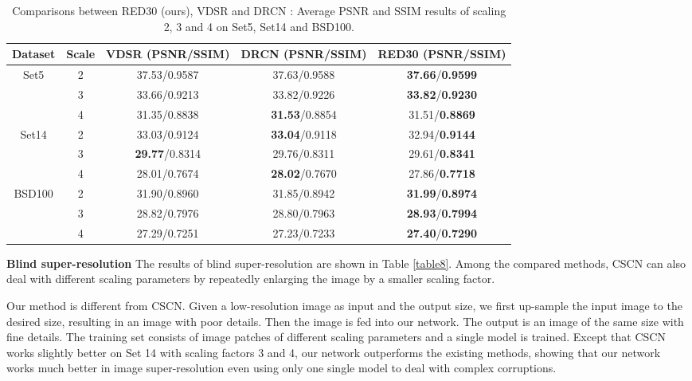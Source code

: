 \documentclass[10pt,journal,compsoc]{IEEEtran}
\begin{document}
\begin{table*}[htb!]
\centering
\caption{Comparisons between RED30 (ours), VDSR \cite{DBLP:journals/corr/KimLL15b}
and DRCN \cite{DBLP:journals/corr/KimLL15a}: Average PSNR and SSIM results of scaling 2, 3 and 4 on Set5, Set14 and BSD100.}
\begin{tabular}{ c|c|c c c }  \hline
Dataset                 &Scale        &VDSR  (PSNR/SSIM)    &DRCN (PSNR/SSIM)    &RED30 (PSNR/SSIM)  \\ \hline
\multirow{3}{*}{Set5}   &2    &37.53/0.9587       &37.63/0.9588       &\textbf{37.66}/\textbf{0.9599}      \\
                        &3    &33.66/0.9213       &33.82/0.9226       &\textbf{33.82}/\textbf{0.9230}      \\
                        &4    &31.35/0.8838       &\textbf{31.53}/0.8854       &31.51/\textbf{0.8869}      \\ \hline\hline
\multirow{3}{*}{Set14}  &2    &33.03/0.9124       &\textbf{33.04}/0.9118       &32.94/\textbf{0.9144}      \\
                        &3    &\textbf{29.77}/0.8314       &29.76/0.8311       &29.61/\textbf{0.8341}      \\
                        &4    &28.01/0.7674       &\textbf{28.02}/0.7670       &27.86/\textbf{0.7718}      \\ \hline\hline
\multirow{3}{*}{BSD100} &2    &31.90/0.8960       &31.85/0.8942       &\textbf{31.99}/\textbf{0.8974}      \\
                        &3    &28.82/0.7976       &28.80/0.7963       &\textbf{28.93}/\textbf{0.7994}      \\
                        &4    &27.29/0.7251       &27.23/0.7233       &\textbf{27.40}/\textbf{0.7290}      \\ \hline
\end{tabular}
\label{table11}
\end{table*}




{\bf{Blind super-resolution}} The results of blind super-resolution are shown in
Table \ref{table8}. Among the compared methods, CSCN can also deal with different
scaling parameters by repeatedly enlarging the image by a smaller scaling factor.

 Our method is
different from CSCN. Given a low-resolution image as input and the output size,
we first up-sample the input image to the desired size, resulting in an image with
poor details. Then the image is fed into our network. The output is an image of the
same size with fine details. The training set consists of image patches of different
scaling parameters and a single model is trained. Except that CSCN works slightly
better on Set 14 with scaling factors 3 and 4, our network  outperforms the existing methods,
showing that our network works much better in image super-resolution even using only
one single model to deal with complex corruptions.
\end{document}
